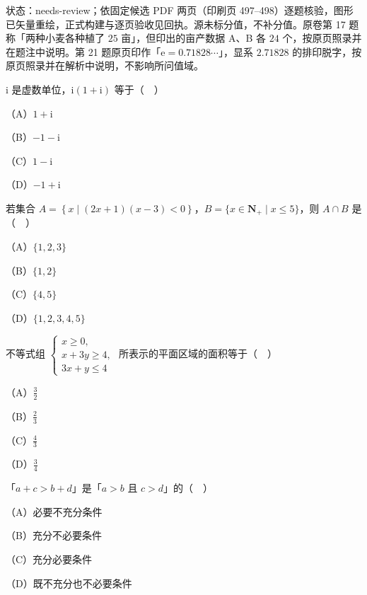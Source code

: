 

状态：needs-review；依固定候选 PDF 两页（印刷页 497–498）逐题核验，图形已矢量重绘，正式构建与逐页验收见回执。源未标分值，不补分值。原卷第 17 题称「两种小麦各种植了 $25$ 亩」，但印出的亩产数据 A、B 各 $24$ 个，按原页照录并在题注中说明。第 21 题原页印作「$\mathrm e=0.71828\cdots$」，显系 $2.71828$ 的排印脱字，按原页照录并在解析中说明，不影响所问值域。


\begin{question}
$\mathrm i$ 是虚数单位，$\mathrm i(1+\mathrm i)$ 等于（　）

（A）$1+\mathrm i$

（B）$-1-\mathrm i$

（C）$1-\mathrm i$

（D）$-1+\mathrm i$

\end{question}
\begin{question}
若集合 $A=\left\{x\mid (2x+1)(x-3)<0\right\}$，$B=\{x\in\mathbf N_+\mid x\leqslant5\}$，则 $A\cap B$ 是（　）

（A）$\{1,2,3\}$

（B）$\{1,2\}$

（C）$\{4,5\}$

（D）$\{1,2,3,4,5\}$

\end{question}
\begin{question}
不等式组 $\begin{cases}x\geqslant0,\\ x+3y\geqslant4,\\ 3x+y\leqslant4\end{cases}$ 所表示的平面区域的面积等于（　）

（A）$\frac32$

（B）$\frac23$

（C）$\frac43$

（D）$\frac34$

\end{question}
\begin{question}
「$a+c>b+d$」是「$a>b$ 且 $c>d$」的（　）

（A）必要不充分条件

（B）充分不必要条件

（C）充分必要条件

（D）既不充分也不必要条件

\end{question}
